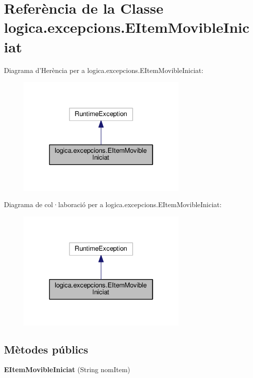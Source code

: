 \hypertarget{classlogica_1_1excepcions_1_1_e_item_movible_iniciat}{\section{Referència de la Classe logica.\+excepcions.\+E\+Item\+Movible\+Iniciat}
\label{classlogica_1_1excepcions_1_1_e_item_movible_iniciat}
}


Diagrama d'Herència per a logica.\+excepcions.\+E\+Item\+Movible\+Iniciat\+:\nopagebreak
\begin{figure}[H]
\begin{center}
\leavevmode
\includegraphics[width=238pt]{classlogica_1_1excepcions_1_1_e_item_movible_iniciat__inherit__graph}
\end{center}
\end{figure}


Diagrama de col·laboració per a logica.\+excepcions.\+E\+Item\+Movible\+Iniciat\+:\nopagebreak
\begin{figure}[H]
\begin{center}
\leavevmode
\includegraphics[width=238pt]{classlogica_1_1excepcions_1_1_e_item_movible_iniciat__coll__graph}
\end{center}
\end{figure}
\subsection*{Mètodes públics}
\begin{DoxyCompactItemize}
\item 
\hypertarget{classlogica_1_1excepcions_1_1_e_item_movible_iniciat_a0aa5e4029ab6142322bdd0c7480a59b5}{{\bfseries E\+Item\+Movible\+Iniciat} (String nom\+Item)}\label{classlogica_1_1excepcions_1_1_e_item_movible_iniciat_a0aa5e4029ab6142322bdd0c7480a59b5}

\end{DoxyCompactItemize}


